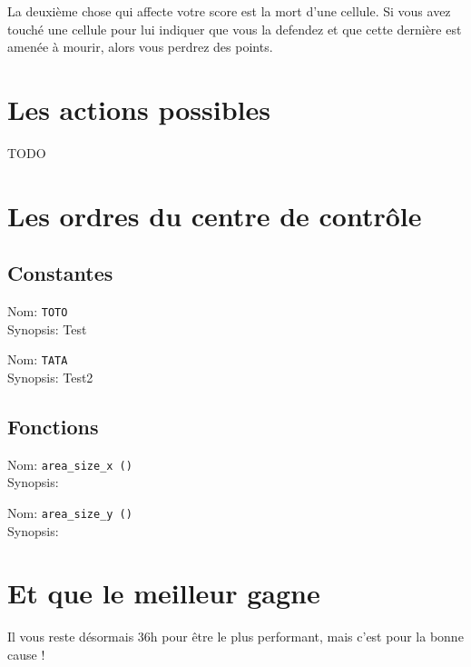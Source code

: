 \documentclass[a4paper,twoside,12pt]{article}
\begin{document}
La  deuxi\`eme  chose  qui  affecte  votre score  est  la  mort  d'une
cellule. Si vous avez touch\'e  une cellule pour lui indiquer que vous
la defendez  et que  cette derni\`ere est  amen\'ee \`a  mourir, alors
vous perdrez des points.

\section{Les actions possibles} %

TODO

\section{Les ordres du centre de contr\^ole} %

\subsection{Constantes}

\noindent
Nom: \verb|TOTO|\\
Synopsis: Test

\-

\noindent
Nom: \verb|TATA|\\
Synopsis: Test2

\subsection{Fonctions}

\noindent
Nom: \verb|area_size_x ()|\\
Synopsis:

\-

\noindent
Nom: \verb|area_size_y ()|\\
Synopsis:

\newpage
\section{Et que le meilleur gagne} %

Il vous reste désormais 36h pour être le plus performant, mais c'est
pour la bonne cause !
\end{document}
